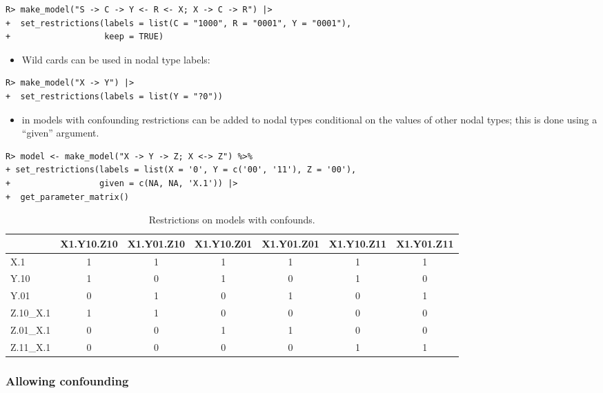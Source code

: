 \documentclass[
  11pt,
  article]{jss}
\providecommand{\tightlist}{%
  \setlength{\itemsep}{0pt}\setlength{\parskip}{0pt}}\usepackage{longtable,booktabs,array}
\begin{document}
\begin{verbatim}
R> make_model("S -> C -> Y <- R <- X; X -> C -> R") |>
+  set_restrictions(labels = list(C = "1000", R = "0001", Y = "0001"), 
+                   keep = TRUE)
\end{verbatim}

\begin{itemize}
\tightlist
\item
  Wild cards can be used in nodal type labels:
\end{itemize}

\begin{verbatim}
R> make_model("X -> Y") |>
+  set_restrictions(labels = list(Y = "?0"))
\end{verbatim}

\begin{itemize}
\tightlist
\item
  in models with confounding restrictions can be added to nodal types
  conditional on the values of other nodal types; this is done using a
  ``given'' argument.
\end{itemize}

\begin{verbatim}
R> model <- make_model("X -> Y -> Z; X <-> Z") %>%
+ set_restrictions(labels = list(X = '0', Y = c('00', '11'), Z = '00'), 
+                  given = c(NA, NA, 'X.1')) |>
+  get_parameter_matrix() 
\end{verbatim}

\hypertarget{tbl-confound-params-mat}{}
\begin{table}
\caption{\label{tbl-confound-params-mat}Restrictions on models with confounds. }\tabularnewline

\centering
\begin{tabular}{lcccccc}
\toprule
  & X1.Y10.Z10 & X1.Y01.Z10 & X1.Y10.Z01 & X1.Y01.Z01 & X1.Y10.Z11 & X1.Y01.Z11\\
\midrule
X.1 & 1 & 1 & 1 & 1 & 1 & 1\\
Y.10 & 1 & 0 & 1 & 0 & 1 & 0\\
Y.01 & 0 & 1 & 0 & 1 & 0 & 1\\
Z.10\_X.1 & 1 & 1 & 0 & 0 & 0 & 0\\
Z.01\_X.1 & 0 & 0 & 1 & 1 & 0 & 0\\
Z.11\_X.1 & 0 & 0 & 0 & 0 & 1 & 1\\
\bottomrule
\end{tabular}
\end{table}

\hypertarget{sec-confounding}{%
\subsubsection{Allowing confounding}\label{sec-confounding}}
\end{document}
